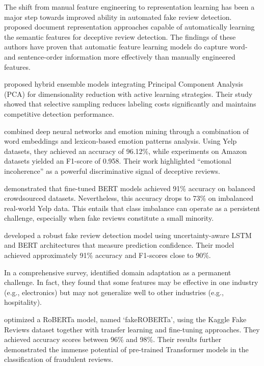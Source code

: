 \documentclass[utf8]{FrontiersinHarvard}
\begin{document}
The shift from manual feature engineering to representation learning has been a major step towards improved ability in automated fake review detection. \citet{Li2017} proposed document representation approaches capable of automatically learning the semantic features for deceptive review detection. The findings of these authors have proven that automatic feature learning models do capture word- and sentence-order information more effectively than manually engineered features.

\citet{Muhammad2019} proposed hybrid ensemble models integrating Principal Component Analysis (PCA) for dimensionality reduction with active learning strategies. Their study showed that selective sampling reduces labeling costs significantly and maintains competitive detection performance.

\citet{Hajek2020} combined deep neural networks and emotion mining through a combination of word embeddings and lexicon-based emotion patterns analysis. Using Yelp datasets, they achieved an accuracy of 96.12\%, while experiments on Amazon datasets yielded an F1-score of 0.958. Their work highlighted ``emotional incoherence'' as a powerful discriminative signal of deceptive reviews.

\citet{Refaeli2021} demonstrated that fine-tuned BERT models achieved 91\% accuracy on balanced crowdsourced datasets. Nevertheless, this accuracy drops to 73\% on imbalanced real-world Yelp data. This entails that class imbalance can operate as a persistent challenge, especially when fake reviews constitute a small minority.

\citet{Zabeen2023} developed a robust fake review detection model using uncertainty-aware LSTM and BERT architectures that measure prediction confidence. Their model achieved approximately 91\% accuracy and F1-scores close to 90\%.

In a comprehensive survey, \citet{Mohawesh2021} identified domain adaptation as a permanent challenge. In fact, they found that some features may be effective in one industry (e.g., electronics) but may not generalize well to other industries (e.g., hospitality).

\citet{Salminen2022} optimized a RoBERTa model, named `fakeROBERTa', using the Kaggle Fake Reviews dataset together with transfer learning and fine-tuning approaches. They achieved accuracy scores between 96\% and 98\%. Their results further demonstrated the immense potential of pre-trained Transformer models in the classification of fraudulent reviews.
\end{document}
